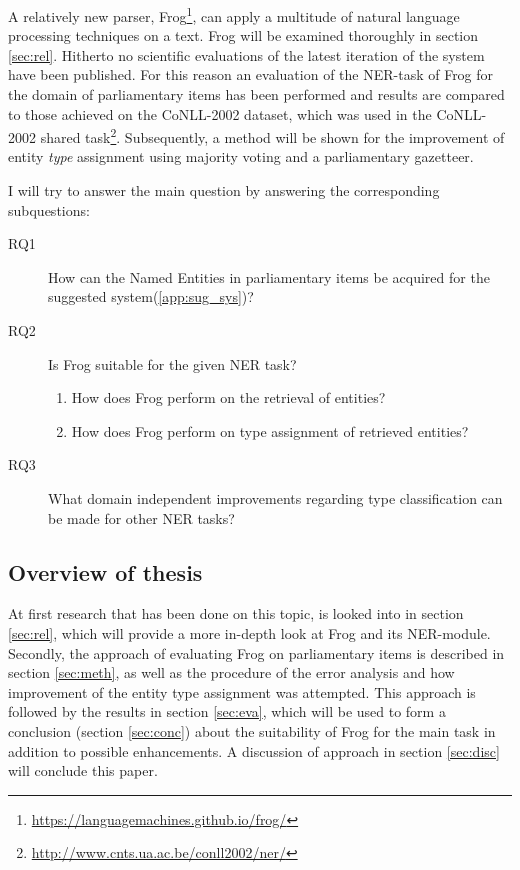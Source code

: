 A relatively new parser, Frog\footnote{\url{https://languagemachines.github.io/frog/}}, can apply a multitude of natural language processing techniques on a text. Frog will be examined thoroughly in section \ref{sec:rel}. Hitherto no scientific evaluations of the latest iteration of the system have been published. For this reason an evaluation of  the NER-task of Frog for the domain of parliamentary items has been performed and results are compared to those achieved on the CoNLL-2002 dataset, which was used in the CoNLL-2002 shared task\footnote{\url{http://www.cnts.ua.ac.be/conll2002/ner/}}. Subsequently, a method will be shown for the improvement of entity \textit{type} assignment using majority voting and a parliamentary gazetteer.

I will try to answer the main question by answering the corresponding subquestions:
\begin{description}
\item[RQ1]How can the Named Entities in parliamentary items be acquired for the suggested system(\ref{app:sug_sys})? 
\item[RQ2] Is Frog suitable for the given NER task?
\begin{enumerate}
\item How does Frog perform on the retrieval of entities?
\item How does Frog perform on type assignment of retrieved entities?
\end{enumerate}
\item[RQ3] What domain independent improvements regarding type classification can be made for other NER tasks?
\end{description}

\subsection{Overview of thesis}
At first research that has been done on this topic, is looked into in section \ref{sec:rel}, which will provide a more in-depth look at Frog and its NER-module. Secondly, the approach of evaluating Frog on parliamentary items is described in section \ref{sec:meth}, as well as the procedure of the error analysis and how improvement of the entity type assignment was attempted. This approach is followed by the results in section \ref{sec:eva}, which will be used to form a conclusion (section \ref{sec:conc}) about the suitability of Frog for the main task in addition to possible enhancements. A discussion of approach in section \ref{sec:disc} will conclude this paper.
